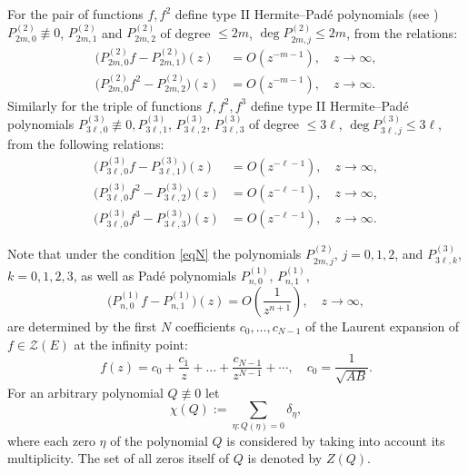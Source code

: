 \documentclass[11pt, a4paper, twoside]{article}
\def\({\left(}
\def\){\right)}
\let\leq\leqslant
\def\mdeg{\operatorname{deg}}
\theoremstyle{plain}
\theoremstyle{definition}
\begin{document}
For the pair of functions $f,f ^ 2$  define type II Hermite--Padé polynomials  (see \cite{NiSo88})  $P ^ {(2)}_{2m,0}\not\equiv 0$, $P ^{(2)}_{2m,1}$ and $P^{(2)}_{2m,2}$ of degree $\leq 2m$, $\mdeg{P ^{(2)}_{2m,j}}\leq{2m}$, from the relations:
\begin{equation}
\begin{aligned}
\bigl(P^{(2)}_{2m,0}f-P^{(2)}_{2m,1}\bigr)(z)
&=O(z^{-m-1}),\quad z\to\infty,\\
\bigl(P^{(2)}_{2m,0}f^2-P^{(2)}_{2m,2}\bigr)(z)
&=O(z^{-m-1}),\quad z\to\infty.
\end{aligned}
\label{hepa2}
\end{equation}
Similarly for the triple of functions $f,f ^ 2,f ^ 3$   define  type II Hermite--Padé polynomials $P^{(3)}_{3\ell,0}\not\equiv0,P^{(3)}_{3\ell,1}$, $P^{(3)}_{3\ell,2}$, $P^{(3)}_{3\ell,3}$ of degree $\leq 3\ell$, $\mdeg{P^{(3)}_{3\ell,j}}\leq{3\ell}$, from the following relations:
\begin{equation}
\begin{aligned}
\bigl(P^{(3)}_{3\ell,0}f-P^{(3)}_{3\ell,1}\bigr)(z)
&=O(z^{-\ell-1}),\quad z\to\infty,\\
\bigl(P^{(3)}_{3\ell,0}f^2-P^{(3)}_{3\ell,2}\bigr)(z)
&=O(z^{-\ell-1}),\quad z\to\infty,\\
\bigl(P^{(3)}_{3\ell,0}f^3-P^{(3)}_{3\ell,3}\bigr)(z)
&=O(z^{-\ell-1}),\quad z\to\infty.
\end{aligned}
\label{hepa3}
\end{equation}

Note that under the condition \eqref{eqN} the polynomials $P^{(2)}_{2m,j}$, $j=0,1,2$, and $P^{(3)}_{3\ell,k}$, $k=0,1,2,3$, as well as  Padé polynomials $P^{(1)}_{n,0}$, $P^{(1)}_{n,1}$, 
\begin{equation}
\bigl(P^{(1)}_{n,0}f-P^{(1)}_{n,1}\bigr)(z)
=O\(\frac1{z^{n+1}}\),\quad z\to\infty,
\label{padedef}
\end{equation}
are determined by the first $N$  coefficients $c_0,\dots,c_{N-1}$ of the Laurent expansion of $f\in\mathscr Z(E)$ at the infinity point:
\begin{equation}
f(z)=c_0+\frac{c_1}z+\dots+\frac{c_{N-1}}{z^{N-1}}+\dotsb,
\quad c_0=\frac1{\sqrt{AB}}.
\label{fexp}
\end{equation}
For an arbitrary polynomial $Q\not\equiv0$ let 
$$
\chi(Q):=\sum_{\eta:Q(\eta)=0}\delta_\eta,
$$
where each zero $\eta$  of the polynomial $Q$ is considered by taking into account its multiplicity.
The set of all zeros itself of $Q$ is denoted by $Z(Q)$.
\end{document}
